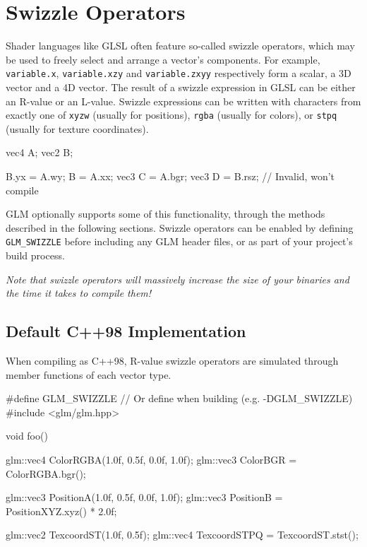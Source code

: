 \documentclass{scrartcl}
\numberwithin{figure}{subsection}
\begin{document}
\newpage{}

\section{Swizzle Operators}

Shader languages like GLSL often feature so-called swizzle operators, which may be used to freely select and arrange a vector's components. For example, \verb|variable.x|, \verb|variable.xzy| and \verb|variable.zxyy| respectively form a scalar, a 3D vector and a 4D vector.  The result of a swizzle expression in GLSL can be either an R-value or an L-value. Swizzle expressions can be written with characters from exactly one of \verb|xyzw| (usually for positions), \verb|rgba| (usually for colors), or \verb|stpq| (usually for texture coordinates).

\begin{glslcode}
vec4 A;
vec2 B;

B.yx = A.wy;
B = A.xx;
vec3 C = A.bgr;
vec3 D = B.rsz; // Invalid, won't compile
\end{glslcode}

GLM optionally supports some of this functionality, through the methods described in the following sections. Swizzle operators can be enabled by defining \verb|GLM_SWIZZLE| before including any GLM header files, or as part of your project's build process.

\emph{Note that swizzle operators will massively increase the size of your binaries and the time it takes to compile them!}

\subsection{Default C++98 Implementation}

When compiling as C++98, R-value swizzle operators are simulated through member functions of each vector type.

\begin{cppcode}
#define GLM_SWIZZLE // Or define when building (e.g. -DGLM_SWIZZLE)
#include <glm/glm.hpp>

void foo()
{
  glm::vec4 ColorRGBA(1.0f, 0.5f, 0.0f, 1.0f);
  glm::vec3 ColorBGR = ColorRGBA.bgr();

  glm::vec3 PositionA(1.0f, 0.5f, 0.0f, 1.0f);
  glm::vec3 PositionB = PositionXYZ.xyz() * 2.0f;

  glm::vec2 TexcoordST(1.0f, 0.5f);
  glm::vec4 TexcoordSTPQ = TexcoordST.stst();
}
\end{cppcode}
\end{document}
